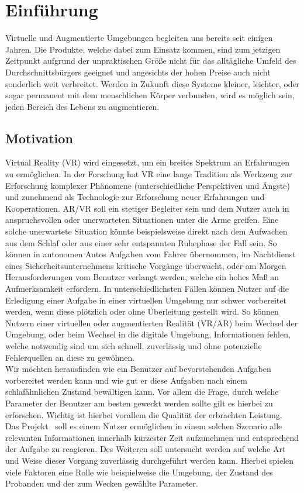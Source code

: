 \chapter{Einführung}
Virtuelle und Augmentierte Umgebungen begleiten uns bereits seit einigen Jahren.  Die Produkte, welche dabei zum Einsatz kommen, sind zum jetzigen Zeitpunkt aufgrund der unpraktischen Größe nicht für das alltägliche Umfeld des Durchschnittsbürgers geeignet und angesichts der hohen Preise auch nicht sonderlich weit verbreitet.
Werden in Zukunft diese Systeme kleiner, leichter, oder sogar permanent mit dem menschlichen Körper verbunden, wird es möglich sein, jeden Bereich des Lebens zu augmentieren. 

\section{Motivation}

Virtual Reality (VR) wird eingesetzt, um ein breites Spektrum an Erfahrungen zu ermöglichen. In der Forschung hat VR eine lange Tradition als Werkzeug zur Erforschung komplexer Phänomene (unterschiedliche Perspektiven und Ängste) und zunehmend als Technologie zur Erforschung neuer Erfahrungen und Kooperationen.
AR/VR soll ein stetiger Begleiter sein und dem Nutzer auch in anspruchsvollen oder unerwarteten Situationen unter die Arme greifen.
Eine solche unerwartete Situation könnte beispielsweise direkt nach dem Aufwachen aus dem Schlaf oder aus einer sehr entspannten Ruhephase der Fall sein. So können in autonomen Autos Aufgaben vom Fahrer übernommen, im Nachtdienst eines Sicherheitsunternehmens kritische Vorgänge überwacht, oder am Morgen Herausforderungen vom Benutzer verlangt werden, welche ein hohes Maß an Aufmerksamkeit erfordern. 
In unterschiedlichsten Fällen können Nutzer auf die Erledigung einer Aufgabe in einer virtuellen Umgebung nur schwer vorbereitet werden, wenn diese  plötzlich oder ohne Überleitung gestellt wird.
So können Nutzern einer virtuellen oder augmentierten Realität (VR/AR) beim Wechsel der Umgebung, oder beim Wechsel in die digitale Umgebung, Informationen fehlen, welche notwendig sind um sich schnell, zuverlässig und ohne potenzielle Fehlerquellen an diese zu gewöhnen.\\
Wir möchten herausfinden wie ein Benutzer auf bevorstehenden Aufgaben vorbereitet werden kann und wie gut er diese Aufgaben nach einem schlafähnlichen Zustand bewältigen kann. Vor allem die Frage, durch welche Parameter der Benutzer am besten geweckt werden sollte gilt es hierbei zu erforschen. Wichtig ist hierbei vorallem die Qualität der erbrachten Leistung.\\
Das Projekt \projectName \  soll es einem Nutzer ermöglichen in einem solchen Szenario alle relevanten Informationen innerhalb kürzester Zeit aufzunehmen und entsprechend der Aufgabe zu reagieren. Des Weiteren soll untersucht werden auf welche Art und Weise dieser Vorgang zuverlässig durchgeführt werden kann. Hierbei spielen viele Faktoren eine Rolle wie beispielweise die Umgebung, der Zustand des Probanden und der zum Wecken gewählte Parameter.\\